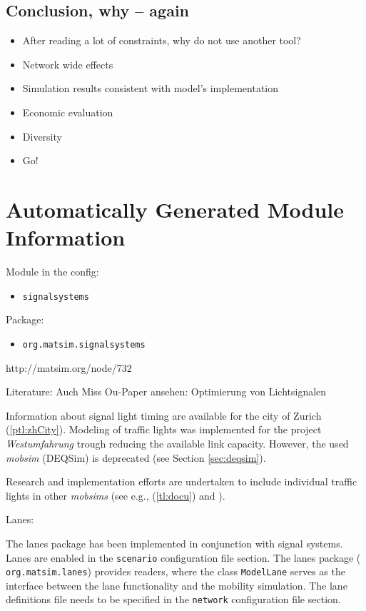 \subsection{Conclusion, why -- again}

\begin{itemize}
	\item After reading a lot of constraints, why do not use another tool?
	\item Network wide effects
	\item Simulation results consistent with model's implementation 
	\item Economic evaluation
	\item Diversity 
	\item Go!
\end{itemize}

\section{Automatically Generated Module Information}
\label{sec:signals_config}
Module in the config: 
\begin{itemize}
	\item \lstinline|signalsystems|
\end{itemize}

Package:
\begin{itemize}
	\item \lstinline|org.matsim.signalsystems|
\end{itemize}

http://matsim.org/node/732

Literature: \citet[][]{GretherEtAl_ABMTRANS_2012, Grether_PhDThesis_2014, Neumann_MastersThesis_2008}
Auch Miss Ou-Paper ansehen: Optimierung von Lichtsignalen

\citet[][p.?]{BalmerEtAl_ResRep_bdktzrh_2009}


Information about signal light timing are available for the city of Zurich  \citep{STAPOZH-DAV_unpub_gtZH_2008} (\ref{ptl:zhCity}). Modeling of traffic lights was implemented for the project \emph{Westumfahrung} trough reducing the available link capacity. However, the used \emph{mobsim} (DEQSim) is deprecated (see Section \ref{sec:deqsim}).

Research and implementation efforts are undertaken to include individual traffic lights in other \emph{mobsims} (see e.g., (\ref{tl:docu}) and \citet[][]{Neumann_MastersThesis_2008}).


Lanes:

The lanes package has been implemented in conjunction with signal systems. Lanes are enabled in the \lstinline|scenario| configuration file section. The lanes package (\lstinline| org.matsim.lanes|) provides readers, where the class \lstinline|ModelLane| serves as the interface between the lane functionality and the mobility simulation. The lane definitions file needs to be specified in the \lstinline|network| configuration file section.

